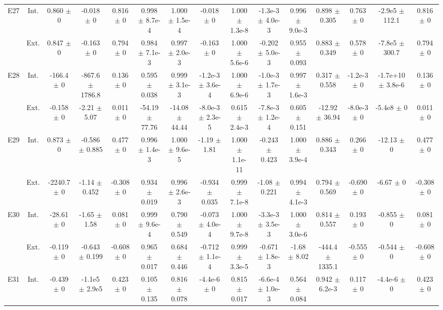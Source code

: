 \begin{table}[htbp]
{\begin{tabular}{@{}ccccccccccccccc@{}}
\cline{2-15}
\multirow{2}{*}{E27} & Int. & 0.860 $\pm$ 0 & -0.018 $\pm$ 0 & 0.816 $\pm$ 0 & 0.998 $\pm$ 8.7e-4 & 1.000 $\pm$ 1.5e-4 & -0.018 $\pm$ 0 & 1.000 $\pm$ 1.3e-8 & -1.3e-3 $\pm$ 4.0e-3 & 0.996 $\pm$ 9.0e-3 & 0.898 $\pm$ 0.305 & 0.763 $\pm$ 0 & -2.9e5 $\pm$ 112.1 & 0.816 $\pm$ 0 \\
 & Ext. & 0.847 $\pm$ 0 & -0.163 $\pm$ 0 & 0.794 $\pm$ 0 & 0.984 $\pm$ 7.1e-3 & 0.997 $\pm$ 2.0e-3 & -0.163 $\pm$ 0 & 1.000 $\pm$ 5.6e-6 & -0.202 $\pm$ 5.0e-3 & 0.955 $\pm$ 0.093 & 0.883 $\pm$ 0.349 & 0.578 $\pm$ 0 & -7.8e5 $\pm$ 300.7 & 0.794 $\pm$ 0 \\
\cline{2-15}
\multirow{2}{*}{E28} & Int. & -166.4 $\pm$ 0 & -867.6 $\pm$ 1786.8 & 0.136 $\pm$ 0 & 0.595 $\pm$ 0.038 & 0.999 $\pm$ 3.1e-3 & -1.2e-3 $\pm$ 3.6e-4 & 1.000 $\pm$ 6.9e-6 & -1.0e-3 $\pm$ 1.7e-3 & 0.997 $\pm$ 1.6e-3 & 0.317 $\pm$ 0.558 & -1.2e-3 $\pm$ 0 & -1.7e+10 $\pm$ 3.8e-6 & 0.136 $\pm$ 0 \\
 & Ext. & -0.158 $\pm$ 0 & -2.21 $\pm$ 5.07 & 0.011 $\pm$ 0 & -54.19 $\pm$ 77.76 & -14.08 $\pm$ 44.44 & -8.0e-3 $\pm$ 2.3e-5 & 0.615 $\pm$ 2.4e-3 & -7.8e-3 $\pm$ 1.2e-4 & 0.605 $\pm$ 0.151 & -12.92 $\pm$ 36.94 & -8.0e-3 $\pm$ 0 & -5.4e8 $\pm$ 0 & 0.011 $\pm$ 0 \\
\cline{2-15}
\multirow{2}{*}{E29} & Int. & 0.873 $\pm$ 0 & -0.586 $\pm$ 0.885 & 0.477 $\pm$ 0 & 0.996 $\pm$ 1.4e-3 & 1.000 $\pm$ 9.6e-5 & -1.19 $\pm$ 1.81 & 1.000 $\pm$ 1.1e-11 & -0.243 $\pm$ 0.423 & 1.000 $\pm$ 3.9e-4 & 0.886 $\pm$ 0.343 & 0.266 $\pm$ 0 & -12.13 $\pm$ 0 & 0.477 $\pm$ 0 \\
 & Ext. & -2240.7 $\pm$ 0 & -1.14 $\pm$ 0.452 & -0.308 $\pm$ 0 & 0.934 $\pm$ 0.019 & 0.996 $\pm$ 2.6e-3 & -0.934 $\pm$ 0.035 & 0.999 $\pm$ 7.1e-8 & -1.08 $\pm$ 0.221 & 0.994 $\pm$ 4.1e-3 & 0.794 $\pm$ 0.569 & -0.690 $\pm$ 0 & -6.67 $\pm$ 0 & -0.308 $\pm$ 0 \\
\cline{2-15}
\multirow{2}{*}{E30} & Int. & -28.61 $\pm$ 0 & -1.65 $\pm$ 1.58 & 0.081 $\pm$ 0 & 0.999 $\pm$ 9.6e-4 & 0.790 $\pm$ 0.549 & -0.073 $\pm$ 4.0e-4 & 1.000 $\pm$ 9.7e-8 & -3.3e-3 $\pm$ 3.5e-3 & 1.000 $\pm$ 3.0e-6 & 0.814 $\pm$ 0.557 & 0.193 $\pm$ 0 & -0.855 $\pm$ 0 & 0.081 $\pm$ 0 \\
 & Ext. & -0.119 $\pm$ 0 & -0.643 $\pm$ 0.199 & -0.608 $\pm$ 0 & 0.965 $\pm$ 0.017 & 0.684 $\pm$ 0.446 & -0.712 $\pm$ 1.1e-4 & 0.999 $\pm$ 3.3e-5 & -0.671 $\pm$ 1.8e-3 & -1.68 $\pm$ 8.02 & -444.4 $\pm$ 1335.1 & -0.555 $\pm$ 0 & -0.544 $\pm$ 0 & -0.608 $\pm$ 0 \\
\cline{2-15}
\multirow{2}{*}{E31} & Int. & -0.439 $\pm$ 0 & -1.1e5 $\pm$ 2.9e5 & 0.423 $\pm$ 0 & 0.105 $\pm$ 0.135 & 0.816 $\pm$ 0.078 & -4.4e-6 $\pm$ 0 & 0.815 $\pm$ 0.017 & -6.6e-4 $\pm$ 1.0e-3 & 0.564 $\pm$ 0.084 & 0.942 $\pm$ 6.2e-3 & 0.117 $\pm$ 0 & -4.4e-6 $\pm$ 0 & 0.423 $\pm$ 0 \\

\end{tabular}}
\end{table}
